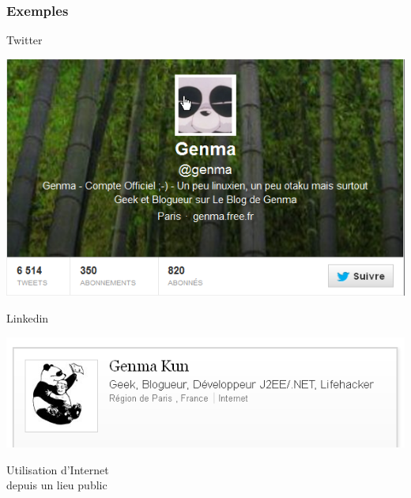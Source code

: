 \documentclass{beamer}
\begin{document}
\begin{frame}
\frametitle{Exemples}

\begin{block}{Twitter}
\begin{center}
\includegraphics[scale=0.3] {./images/Twitter.png}
\end{center}
\end{block}

\begin{block}{Linkedin}
\begin{center}
\includegraphics[scale=0.3] {./images/Linkedin.png}
\end{center}
\end{block}

\end{frame}


\begin{frame}
\begin{center}
\Huge{Utilisation d'Internet \\depuis un lieu public}
\end{center}
\end{frame}
\end{document}

